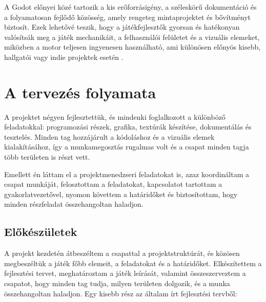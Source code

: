 \documentclass[12pt,a4paper]{article}
\begin{document}
A Godot előnyei közé tartozik a kis erőforrásigény, a széleskörű dokumentáció és a folyamatosan fejlődő közösség, amely rengeteg mintaprojektet és bővítményt biztosít. Ezek lehetővé teszik, hogy a játékfejlesztők gyorsan és hatékonyan valósítsák meg a játék mechanikáit, a felhasználói felületet és a vizuális elemeket, miközben a motor teljesen ingyenesen használható, ami különösen előnyös kisebb, hallgatói vagy indie projektek esetén \cite{holfeld2023relevance,salmela2022game}.


\section{A tervezés folyamata}

A projektet négyen fejlesztettük, és mindenki foglalkozott a különböző feladatokkal: programozási részek, grafika, textúrák készítése, dokumentálás és tesztelés. Minden tag hozzájárult a kódoláshoz és a vizuális elemek kialakításához, így a munkamegosztás rugalmas volt és a csapat minden tagja több területen is részt vett.

Emellett én láttam el a projektmenedzseri feladatokat is, azaz koordináltam a csapat munkáját, felosztottam a feladatokat, kapcsolatot tartottam a gyakorlatvezetővel, nyomon követtem a határidőket és biztosítottam, hogy minden részfeladat összehangoltan haladjon.  

\subsection{Előkészületek}

A projekt kezdetén átbeszéltem a csapattal a projektstruktúrát, és közösen megbeszéltük a játék főbb elemeit, a feladatokat és a határidőket. Elkészítettem a fejlesztési tervet, meghatároztam a játék leírását, valamint összeszerveztem a csapatot, hogy minden tag tudja, milyen területen dolgozik, és a munka összehangoltan haladjon.  
Egy kisebb rész az általam írt fejlesztési tervből:
\end{document}
